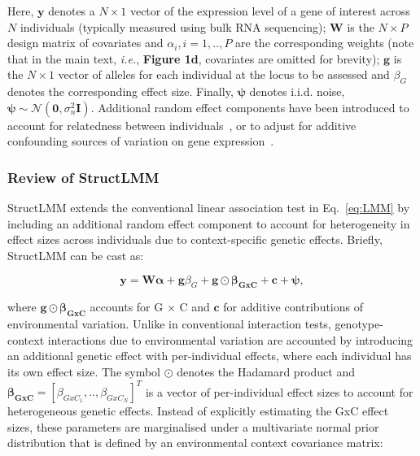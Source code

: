 Here, $\mathbf{y}$ denotes a $N \times 1$ vector of the expression level of a gene of interest across $N$ individuals (typically measured using bulk RNA sequencing); $\mathbf{W}$ is the $N \times P$ design matrix of covariates and $\alpha_i, i=1,..,P$ are the corresponding weights (note that in the main text, \textit{i.e.}, \textbf{Figure 1d}, covariates are omitted for brevity); $\mathbf{g}$ is the $N \times 1$ vector of alleles for each individual at the locus to be assessed and $\beta_G$ denotes the corresponding effect size.
Finally, $\boldsymbol{\psi}$ denotes i.i.d. noise, $\boldsymbol{\psi} \sim \mathcal{N}(\mathbf{0}, \sigma_n^2\mathbf{I})$.
Additional random effect components have been introduced to account for relatedness between individuals~\cite{hoffman2013correcting}, or to adjust for additive confounding sources of variation on gene expression~\cite{fusi2012joint}. 

\subsubsection*{Review of StructLMM}
StructLMM \cite{moore2019linear} extends the conventional linear association test in Eq.~\eqref{eq:LMM} by including an additional random effect component to account for heterogeneity in effect sizes across individuals due to context-specific genetic effects. 
Briefly, StructLMM can be cast as:

\begin{equation}\label{eq:StructLMM}
 \mathbf{y} =  \mathbf{W}\boldsymbol{\alpha} + \mathbf{g}\beta_G + \mathbf{g} \odot \boldsymbol{\beta_{GxC}} + \mathbf{c} +\boldsymbol{\psi}, 
\end{equation}

where $\mathbf{g} \odot \boldsymbol{\beta_{GxC}}$ accounts for G $\times$ C and $\mathbf{c}$ for additive contributions of environmental variation. 
Unlike in conventional interaction tests, genotype-context interactions due to environmental variation are accounted by introducing an additional genetic effect with per-individual effects, where each individual has its own effect size.
The symbol $\odot$ denotes the Hadamard product and $\boldsymbol{\beta_{GxC}}=[\beta_{GxC_1}, .. ,\beta_{GxC_N}]^T$ is a vector of per-individual effect sizes to account for heterogeneous genetic effects.
Instead of explicitly estimating the GxC effect sizes, these parameters are marginalised under a multivariate normal prior distribution that is defined by an environmental context covariance matrix:

